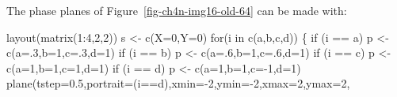 \documentclass[
  a4paper,
  DIV=11,
  numbers=noendperiod]{scrreprt}
\newenvironment{Shaded}{\begin{snugshade}}{\end{snugshade}}
\newcommand{\AttributeTok}[1]{\textcolor[rgb]{0.40,0.45,0.13}{#1}}
\newcommand{\ControlFlowTok}[1]{\textcolor[rgb]{0.00,0.23,0.31}{#1}}
\newcommand{\DecValTok}[1]{\textcolor[rgb]{0.68,0.00,0.00}{#1}}
\newcommand{\FloatTok}[1]{\textcolor[rgb]{0.68,0.00,0.00}{#1}}
\newcommand{\FunctionTok}[1]{\textcolor[rgb]{0.28,0.35,0.67}{#1}}
\newcommand{\NormalTok}[1]{\textcolor[rgb]{0.00,0.23,0.31}{#1}}
\newcommand{\OtherTok}[1]{\textcolor[rgb]{0.00,0.23,0.31}{#1}}
\newcommand{\SpecialCharTok}[1]{\textcolor[rgb]{0.37,0.37,0.37}{#1}}
\newcommand{\StringTok}[1]{\textcolor[rgb]{0.13,0.47,0.30}{#1}}
\begin{document}
The phase planes of Figure~\ref{fig-ch4n-img16-old-64} can be made with:

\begin{Shaded}
\begin{Highlighting}[]
\FunctionTok{layout}\NormalTok{(}\FunctionTok{matrix}\NormalTok{(}\DecValTok{1}\SpecialCharTok{:}\DecValTok{4}\NormalTok{,}\DecValTok{2}\NormalTok{,}\DecValTok{2}\NormalTok{))}
\NormalTok{s }\OtherTok{\textless{}{-}} \FunctionTok{c}\NormalTok{(}\AttributeTok{X=}\DecValTok{0}\NormalTok{,}\AttributeTok{Y=}\DecValTok{0}\NormalTok{) }
\ControlFlowTok{for}\NormalTok{(i }\ControlFlowTok{in} \FunctionTok{c}\NormalTok{(}\StringTok{\textquotesingle{}a\textquotesingle{}}\NormalTok{,}\StringTok{\textquotesingle{}b\textquotesingle{}}\NormalTok{,}\StringTok{\textquotesingle{}c\textquotesingle{}}\NormalTok{,}\StringTok{\textquotesingle{}d\textquotesingle{}}\NormalTok{))}
\NormalTok{\{}
  \ControlFlowTok{if}\NormalTok{ (i }\SpecialCharTok{==} \StringTok{\textquotesingle{}a\textquotesingle{}}\NormalTok{) p }\OtherTok{\textless{}{-}} \FunctionTok{c}\NormalTok{(}\AttributeTok{a=}\NormalTok{.}\DecValTok{3}\NormalTok{,}\AttributeTok{b=}\DecValTok{1}\NormalTok{,}\AttributeTok{c=}\NormalTok{.}\DecValTok{3}\NormalTok{,}\AttributeTok{d=}\DecValTok{1}\NormalTok{)}
  \ControlFlowTok{if}\NormalTok{ (i }\SpecialCharTok{==} \StringTok{\textquotesingle{}b\textquotesingle{}}\NormalTok{) p }\OtherTok{\textless{}{-}} \FunctionTok{c}\NormalTok{(}\AttributeTok{a=}\NormalTok{.}\DecValTok{6}\NormalTok{,}\AttributeTok{b=}\DecValTok{1}\NormalTok{,}\AttributeTok{c=}\NormalTok{.}\DecValTok{6}\NormalTok{,}\AttributeTok{d=}\DecValTok{1}\NormalTok{)}
  \ControlFlowTok{if}\NormalTok{ (i }\SpecialCharTok{==} \StringTok{\textquotesingle{}c\textquotesingle{}}\NormalTok{) p }\OtherTok{\textless{}{-}} \FunctionTok{c}\NormalTok{(}\AttributeTok{a=}\DecValTok{1}\NormalTok{,}\AttributeTok{b=}\DecValTok{1}\NormalTok{,}\AttributeTok{c=}\DecValTok{1}\NormalTok{,}\AttributeTok{d=}\DecValTok{1}\NormalTok{)}
  \ControlFlowTok{if}\NormalTok{ (i }\SpecialCharTok{==} \StringTok{\textquotesingle{}d\textquotesingle{}}\NormalTok{) p }\OtherTok{\textless{}{-}} \FunctionTok{c}\NormalTok{(}\AttributeTok{a=}\DecValTok{1}\NormalTok{,}\AttributeTok{b=}\DecValTok{1}\NormalTok{,}\AttributeTok{c=}\SpecialCharTok{{-}}\DecValTok{1}\NormalTok{,}\AttributeTok{d=}\DecValTok{1}\NormalTok{)}
  \FunctionTok{plane}\NormalTok{(}\AttributeTok{tstep=}\FloatTok{0.5}\NormalTok{,}\AttributeTok{portrait=}\NormalTok{(i}\SpecialCharTok{==}\StringTok{\textquotesingle{}d\textquotesingle{}}\NormalTok{),}\AttributeTok{xmin=}\SpecialCharTok{{-}}\DecValTok{2}\NormalTok{,}\AttributeTok{ymin=}\SpecialCharTok{{-}}\DecValTok{2}\NormalTok{,}\AttributeTok{xmax=}\DecValTok{2}\NormalTok{,}\AttributeTok{ymax=}\DecValTok{2}\NormalTok{,}

\end{Highlighting}
\end{Shaded}
\end{document}
